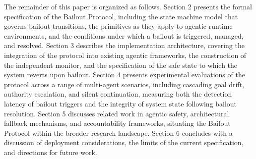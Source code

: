 The remainder of this paper is organized as follows. Section 2 presents the formal specification of the Bailout Protocol, including the state machine model that governs bailout transitions, the \bxthree primitives as they apply to agentic runtime environments, and the conditions under which a bailout is triggered, managed, and resolved. Section 3 describes the implementation architecture, covering the integration of the protocol into existing agentic frameworks, the construction of the independent monitor, and the specification of the safe state to which the system reverts upon bailout. Section 4 presents experimental evaluations of the protocol across a range of multi-agent scenarios, including cascading goal drift, authority escalation, and silent continuation, measuring both the detection latency of bailout triggers and the integrity of system state following bailout resolution. Section 5 discusses related work in agentic safety, architectural fallback mechanisms, and accountability frameworks, situating the Bailout Protocol within the broader research landscape. Section 6 concludes with a discussion of deployment considerations, the limits of the current specification, and directions for future work.
